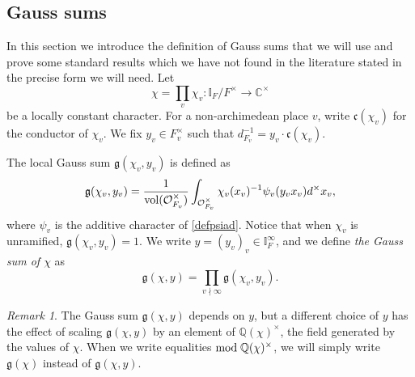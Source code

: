 \documentclass{amsart}
\theoremstyle{definition}
\theoremstyle{remark}
\newtheorem{remark}[theorem]{Remark}
\numberwithin{equation}{section}
\newcommand{\Q}{{\mathbb Q}}
\newcommand{\C}{{\mathbb C}}
\newcommand{\I}{{\mathbb I}}
\newcommand{\cO}{{\mathcal O}}
\begin{document}
\subsection{Gauss sums}\label{Gausssumssec} In this section we introduce the definition of Gauss sums that we will use and prove some standard results which we have not found in the literature stated in the precise form we will need. Let  $$\chi=\prod_v\chi_v:\I_F/F^\times\rightarrow\C^\times$$ be a locally constant character. For a non-archimedean place $v$, write $\mathfrak{c}(\chi_v)$ for the conductor of $\chi_v$. 
 We fix $y_v\in F_v^\times$ such that $d_{F_v}^{-1}=y_v\cdot\mathfrak{c}(\chi_v)$.

The local Gauss sum $\mathfrak{g}(\chi_v,y_v)$ is defined as
\[
\mathfrak{g}(\chi_v,y_v)=\frac{1}{{\rm vol}(\cO_{F_v}^\times)}\int_{\cO_{F_v}^\times}\chi_v(x_v)^{-1}\psi_v(y_vx_v)d^\times x_v,
\]
where $\psi_v$  is the additive character of \eqref{defpsiad}.
Notice that when $\chi_v$ is unramified, $\mathfrak{g}(\chi_v,y_v)=1$.
We write $y=(y_v)_v\in \I_F^\infty$, and we define \emph{the Gauss sum of $\chi$} as
\[
\mathfrak{g}(\chi,y)=\prod_{v\nmid\infty}\mathfrak{g}(\chi_v,y_v).
\]
\begin{remark}
    The Gauss sum $\mathfrak{g}(\chi,y)$ depends on $y$, but a different choice of $y$ has the effect of scaling  $\mathfrak{g}(\chi,y)$ by an element of $\Q(\chi)^\times$, the field generated by the values of $\chi$. When we write equalities ${\rm mod}\; \Q(\chi)^\times$, we will simply write $\mathfrak{g}(\chi)$ instead of $\mathfrak{g}(\chi,y)$.
\end{remark}
\end{document}
